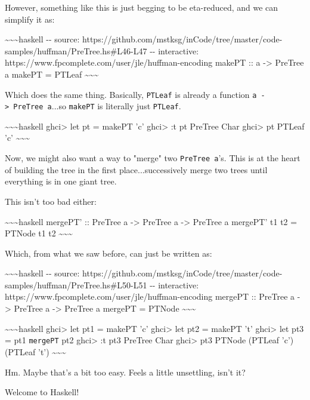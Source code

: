 \documentclass[]{article}
\begin{document}
However, something like this is just begging to be eta-reduced, and we can
simplify it as:

\textasciitilde{}\textasciitilde{}\textasciitilde{}haskell -\/- source:
https://github.com/mstksg/inCode/tree/master/code-samples/huffman/PreTree.hs\#L46-L47
-\/- interactive: https://www.fpcomplete.com/user/jle/huffman-encoding makePT ::
a -\textgreater{} PreTree a makePT = PTLeaf
\textasciitilde{}\textasciitilde{}\textasciitilde{}

Which does the same thing. Basically, \texttt{PTLeaf} is already a function
\texttt{a\ -\textgreater{}\ PreTree\ a}...so \texttt{makePT} is literally just
\texttt{PTLeaf}.

\textasciitilde{}\textasciitilde{}\textasciitilde{}haskell ghci\textgreater{}
let pt = makePT 'c' ghci\textgreater{} :t pt PreTree Char ghci\textgreater{} pt
PTLeaf 'c' \textasciitilde{}\textasciitilde{}\textasciitilde{}

Now, we might also want a way to "merge" two \texttt{PreTree\ a}'s. This is at
the heart of building the tree in the first place...successively merge two trees
until everything is in one giant tree.

This isn't too bad either:

\textasciitilde{}\textasciitilde{}\textasciitilde{}haskell mergePT' :: PreTree a
-\textgreater{} PreTree a -\textgreater{} PreTree a mergePT' t1 t2 = PTNode t1
t2 \textasciitilde{}\textasciitilde{}\textasciitilde{}

Which, from what we saw before, can just be written as:

\textasciitilde{}\textasciitilde{}\textasciitilde{}haskell -\/- source:
https://github.com/mstksg/inCode/tree/master/code-samples/huffman/PreTree.hs\#L50-L51
-\/- interactive: https://www.fpcomplete.com/user/jle/huffman-encoding mergePT
:: PreTree a -\textgreater{} PreTree a -\textgreater{} PreTree a mergePT =
PTNode \textasciitilde{}\textasciitilde{}\textasciitilde{}

\textasciitilde{}\textasciitilde{}\textasciitilde{}haskell ghci\textgreater{}
let pt1 = makePT 'c' ghci\textgreater{} let pt2 = makePT 't' ghci\textgreater{}
let pt3 = pt1 \texttt{mergePT} pt2 ghci\textgreater{} :t pt3 PreTree Char
ghci\textgreater{} pt3 PTNode (PTLeaf 'c') (PTLeaf 't')
\textasciitilde{}\textasciitilde{}\textasciitilde{}

Hm. Maybe that's a bit too easy. Feels a little unsettling, isn't it?

Welcome to Haskell!
\end{document}
